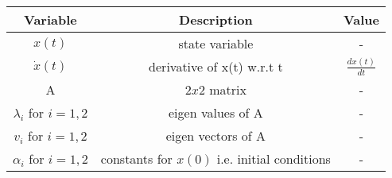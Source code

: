 \begin{tabular}{|c|c|c|} 
      \hline
\textbf{Variable}& \textbf{Description}& \textbf{Value}\\\hline
	 ${x}(t)$ & state variable & - \\\hline
         $\dot{{x}}(t)$ & derivative of x(t) w.r.t t & $\frac{d{x}(t)}{dt}$\\\hline  
         A & $2x2$ matrix & -\\\hline
         $\lambda _i$ for $i = 1, 2$ & eigen values of A & - \\\hline
         $v_i$ for $i = 1, 2$ & eigen vectors of A & - \\\hline
         $\alpha _i$ for $i = 1, 2$ & constants for ${x}(0)$ i.e. initial conditions & - \\\hline
    \end{tabular}
